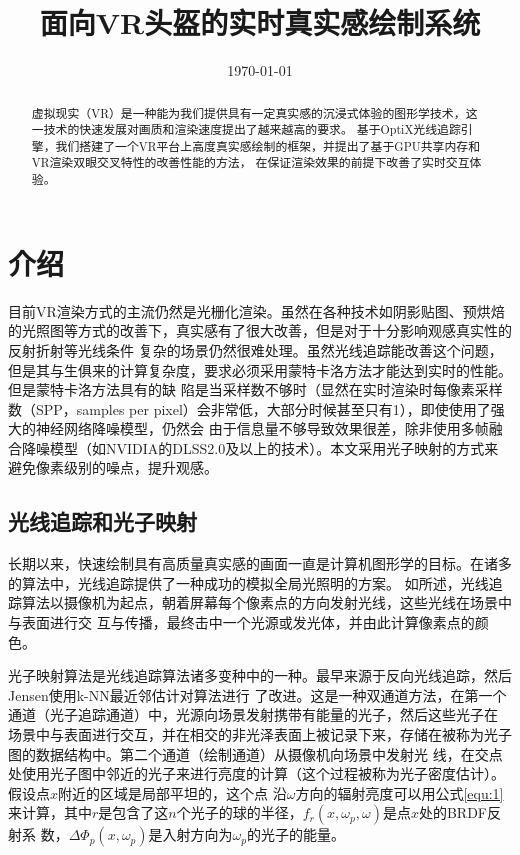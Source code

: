 \documentclass[UTF8]{ctexart}
\title{面向VR头盔的实时真实感绘制系统}
\author{}
\date{\today}
\begin{document}
\maketitle
\begin{abstract}
    虚拟现实（VR）是一种能为我们提供具有一定真实感的沉浸式体验的图形学技术，这一技术的快速发展对画质和渲染速度提出了越来越高的要求。
    基于OptiX光线追踪引擎，我们搭建了一个VR平台上高度真实感绘制的框架，并提出了基于GPU共享内存和VR渲染双眼交叉特性的改善性能的方法，
    在保证渲染效果的前提下改善了实时交互体验。
\end{abstract}

\section{介绍}
    目前VR渲染方式的主流仍然是光栅化渲染。虽然在各种技术如阴影贴图、预烘焙的光照图等方式的改善下，真实感有了很大改善，但是对于十分影响观感真实性的反射折射等光线条件
    复杂的场景仍然很难处理。虽然光线追踪能改善这个问题，但是其与生俱来的计算复杂度，要求必须采用蒙特卡洛方法才能达到实时的性能。但是蒙特卡洛方法具有的缺
    陷是当采样数不够时（显然在实时渲染时每像素采样数（SPP，samples per pixel）会非常低，大部分时候甚至只有1），即使使用了强大的神经网络降噪模型，仍然会
    由于信息量不够导致效果很差，除非使用多帧融合降噪模型（如NVIDIA的DLSS2.0及以上的技术）。本文采用光子映射的方式来避免像素级别的噪点，提升观感。
    \subsection{光线追踪和光子映射}
        长期以来，快速绘制具有高质量真实感的画面一直是计算机图形学的目标。在诸多的算法中，光线追踪提供了一种成功的模拟全局光照明的方案。
        如\cite{GlobalIllumination}所述，光线追踪算法以摄像机为起点，朝着屏幕每个像素点的方向发射光线，这些光线在场景中与表面进行交
        互与传播，最终击中一个光源或发光体，并由此计算像素点的颜色。
        
        光子映射算法是光线追踪算法诸多变种中的一种。最早来源于反向光线追踪\cite{ARVO1986Backward}，然后Jensen使用k-NN最近邻估计对算法进行
        了改进\cite{Jensen1996Global}。这是一种双通道方法，在第一个通道（光子追踪通道）中，光源向场景发射携带有能量的光子，然后这些光子在
        场景中与表面进行交互，并在相交的非光泽表面上被记录下来，存储在被称为光子图的数据结构中。第二个通道（绘制通道）从摄像机向场景中发射光
        线，在交点处使用光子图中邻近的光子来进行亮度的计算（这个过程被称为光子密度估计）。假设点$x$附近的区域是局部平坦的，这个点
        沿$\omega$方向的辐射亮度可以用公式\ref{equ:1}来计算，其中$r$是包含了这$n$个光子的球的半径，$f_r(x,\omega_p,\omega)$是点$x$处的BRDF反射系
        数，$\Delta\Phi_p(x,\omega_p)$是入射方向为$\omega_p$的光子的能量。
        
\end{document}
